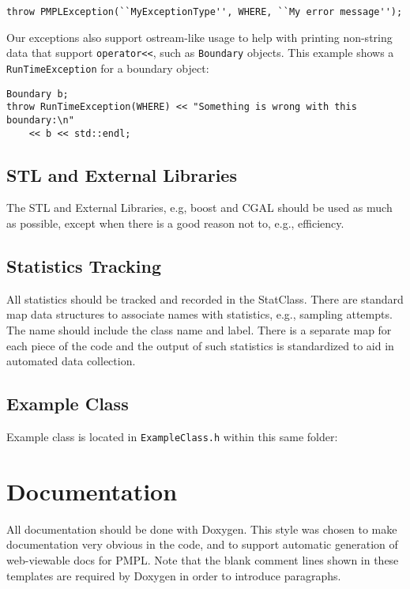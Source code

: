 \documentclass[12pt]{article}
\begin{document}
\begin{lstlisting}
throw PMPLException(``MyExceptionType'', WHERE, ``My error message'');
\end{lstlisting}

Our exceptions also support ostream-like usage to help with printing non-string
data that support \texttt{operator<<}, such as \texttt{Boundary} objects. This
example shows a \texttt{RunTimeException} for a boundary object:

\begin{lstlisting}
Boundary b;
throw RunTimeException(WHERE) << "Something is wrong with this boundary:\n"
    << b << std::endl;
\end{lstlisting}

\subsection{STL and External Libraries}

The STL and External Libraries, e.g, boost and CGAL should be used as much as
possible, except when there is a good reason not to, e.g., efficiency.

\subsection{Statistics Tracking}

All statistics should be tracked and recorded in the StatClass. There are
standard map data structures to associate names with statistics, e.g., sampling
attempts. The name should include the class name and label. There is a separate
map for each piece of the code and the output of such statistics is standardized
to aid in automated data collection.

\subsection{Example Class}
Example class is located in \texttt{ExampleClass.h} within this same folder:




\section{Documentation}
All documentation should be done with Doxygen. This style was chosen to make
documentation very obvious in the code, and to support automatic generation of
web-viewable docs for PMPL. Note that the blank comment lines shown in these
templates are required by Doxygen in order to introduce paragraphs.
\end{document}
